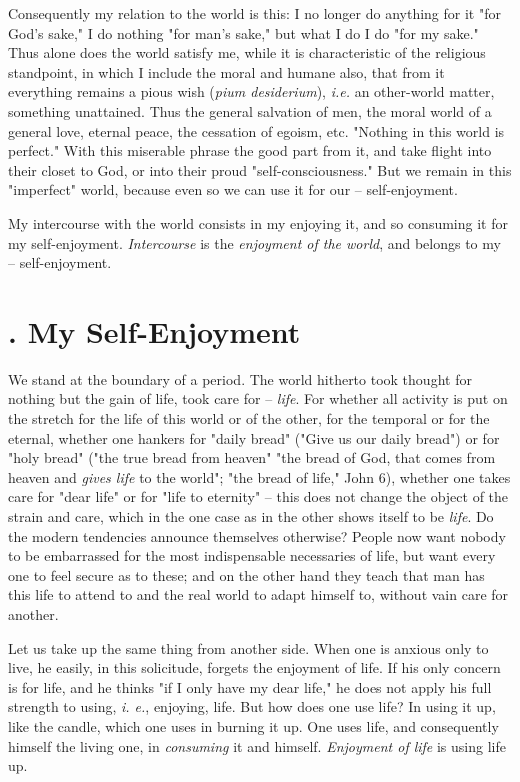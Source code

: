 \documentclass[a4paper]{book}
\begin{document}
Consequently my relation to the world is this: I no longer do anything for it 
"{}for God's sake,"{} I do nothing "{}for man's sake,"{} but what I do I do 
"{}for my sake."{} Thus alone does the world satisfy me, while it is 
characteristic of the religious standpoint, in which I include the moral and 
humane also, that from it everything remains a pious wish (\textit{pium 
desiderium}), \textit{i.e.} an other-world matter, something unattained. Thus 
the general salvation of men, the moral world of a general love, eternal 
peace, the cessation of egoism, etc. "{}Nothing in this world is perfect."{} 
With this miserable phrase the good part from it, and take flight into their 
closet to God, or into their proud "{}self-consciousness."{} But we remain in 
this "{}imperfect"{} world, because even so we can use it for our -- 
self-enjoyment.

My intercourse with the world consists in my enjoying it, and so consuming it 
for my self-enjoyment. \textit{Intercourse} is the \textit{enjoyment of the 
world}, and belongs to my -- self-enjoyment.

\section[3. My Self-Enjoyment]{. My Self-Enjoyment}

We stand at the boundary of a period. The world hitherto took thought for 
nothing but the gain of life, took care for -- \textit{life}. For whether all 
activity is put on the stretch for the life of this world or of the other, for 
the temporal or for the eternal, whether one hankers for "{}daily bread"{} 
("{}Give us our daily bread"{}) or for "{}holy bread"{} ("{}the true bread 
from heaven"{} "{}the bread of God, that comes from heaven and \textit{gives 
life} to the world"{}; "{}the bread of life,"{} John 6), whether one takes 
care for "{}dear life"{} or for "{}life to eternity"{} -- this does not change 
the object of the strain and care, which in the one case as in the other shows 
itself to be \textit{life}. Do the modern tendencies announce themselves 
otherwise? People now want nobody to be embarrassed for the most indispensable 
necessaries of life, but want every one to feel secure as to these; and on the 
other hand they teach that man has this life to attend to and the real world 
to adapt himself to, without vain care for another.

Let us take up the same thing from another side. When one is anxious only to 
live, he easily, in this solicitude, forgets the enjoyment of life. If his 
only concern is for life, and he thinks "{}if I only have my dear life,"{} he 
does not apply his full strength to using, \textit{i. e.}, enjoying, life. But 
how does one use life? In using it up, like the candle, which one uses in 
burning it up. One uses life, and consequently himself the living one, in 
\textit{consuming} it and himself. \textit{Enjoyment of life} is using life 
up.
\end{document}
